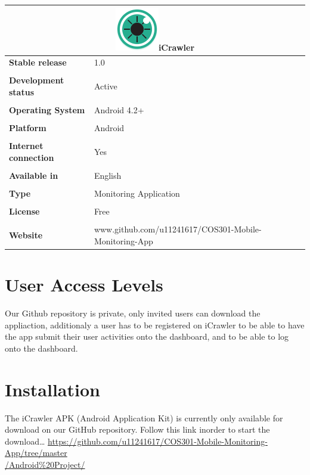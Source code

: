 \documentclass[hidelinks, 12pt, oneside]{article}
\begin{document}
	\begin{tabular}{ |l|l| }  \multicolumn{2}{|c|}{\includegraphics[width=0.1 \textwidth]{img/icon.png}iCrawler}
	 \\ \hline\noalign{\smallskip} \textbf{Stable release} & 1.0
	  \\\\ \noalign{\smallskip} \textbf{Development status}& Active
	  \\\\ \noalign{\smallskip}\textbf{Operating System}& Android 4.2+
	  \\\\ \noalign{\smallskip}\textbf{Platform}& Android
	  \\\\ \noalign{\smallskip}\textbf{Internet connection} & Yes
	  \\\\ \noalign{\smallskip}\textbf{Available in} & English
	  \\\\ \noalign{\smallskip}\textbf{Type}& Monitoring Application
	  \\\\ \noalign{\smallskip}\textbf{License}& Free
	  \\\\ \noalign{\smallskip}\textbf{Website}& www.github.com/u11241617/COS301-Mobile-Monitoring-App
	 \end{tabular}\newpage
	\section{User Access Levels}
		Our Github repository is private, only invited users can download the appliaction, additionaly a user has  to be registered on iCrawler to be able to have the app submit their user activities onto the dashboard, and to be able to log onto the dashboard.\newline
	\section{Installation}
	The iCrawler APK (Android Application Kit) is currently only available for download on our GitHub repository. Follow this link inorder 
	to start the download\dots\newline
		\href{url}{https://github.com/u11241617/COS301-Mobile-Monitoring-App/tree/master\\/Android\%20Project/}\newline
\end{document}
